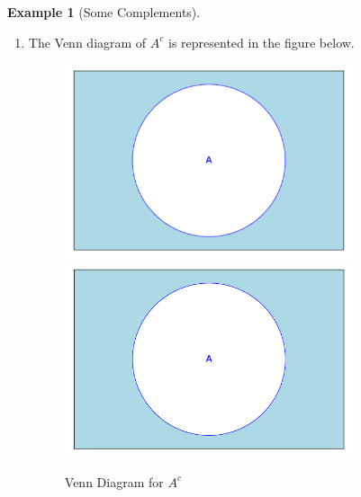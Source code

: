 \documentclass[10pt,]{book}
\theoremstyle{plain}
\theoremstyle{definition}
\newtheorem{example}[theorem]{Example}
\begin{document}
\begin{example}[Some Complements]
\begin{enumerate}
\item\hypertarget{li-59}{} The Venn diagram of \(A^c\) is represented in the figure below. 
            \leavevmode%
\begin{figure}
\centering
{}%
{\includegraphics[width=0.80\textwidth]{images/sageplot-venn-complement2.pdf}}%
{\includegraphics[width=0.80\textwidth]{images/sageplot-venn-complement2.png}}
\caption{Venn Diagram for \(A^{c}\)\label{venn_diagram_complement2}}
\end{figure}
 

\end{enumerate}
\end{example}
\end{document}
